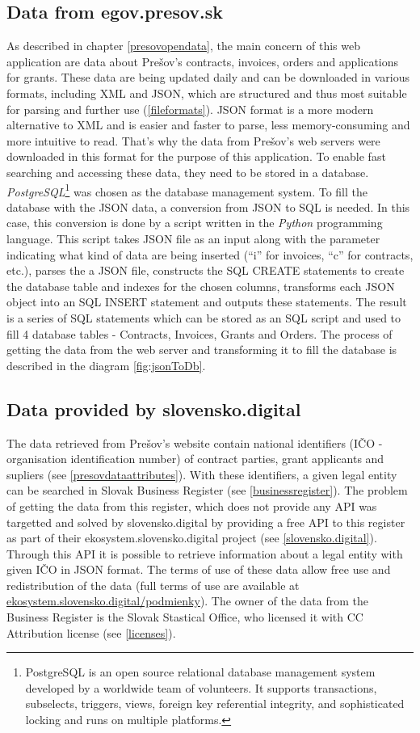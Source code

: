 \documentclass[thesis=B,english]{sprlajur-slovakopendata}[2018/05/12]
\begin{document}
\subsection{Data from egov.presov.sk}
As described in chapter \ref{presovopendata}, the main concern of this web application are data about Prešov's contracts, invoices, orders and applications for grants. These data are being updated daily and can be downloaded in various formats, including XML and JSON, which are structured and thus most suitable for parsing and further use (\ref{fileformats}). JSON format is a more modern alternative to XML and is easier and faster to parse, less memory-consuming and more intuitive to read. That's why the data from Prešov's web servers were downloaded in this format for the purpose of this application. To enable fast searching and accessing these data, they need to be stored in a database. \textit{PostgreSQL}\footnote{PostgreSQL is an open source relational database management system developed by a worldwide team of volunteers. It supports transactions, subselects, triggers, views, foreign key referential integrity, and sophisticated locking and runs on multiple platforms.} was chosen as the database management system. To fill the database with the JSON data, a conversion from JSON to SQL is needed. In this case, this conversion is done by a script written in the \textit{Python} programming language. This script takes JSON file as an input along with the parameter indicating what kind of data are being inserted (``i'' for invoices, ``c'' for contracts, etc.), parses the a JSON file, constructs the SQL CREATE statements to create the database table and indexes for the chosen columns, transforms each JSON object into an SQL INSERT statement and outputs these statements. The result is a series of SQL statements which can be stored as an SQL script and used to fill 4 database tables - Contracts, Invoices, Grants and Orders. The process of getting the data from the web server and transforming it to fill the database is described in the diagram \ref{fig:jsonToDb}.

\subsection{Data provided by slovensko.digital}
\label{data-slovensko-digital}
The data retrieved from Prešov's website contain national identifiers (IČO - organisation identification number) of contract parties, grant applicants and supliers (see \ref{presovdataattributes}). With these identifiers, a given legal entity can be searched in Slovak Business Register (see \ref{businessregister}). The problem of getting the data from this register, which does not provide any API was targetted and solved by slovensko.digital by providing a free API to this register as part of their ekosystem.slovensko.digital project (see \ref{slovensko.digital}). Through this API it is possible to retrieve information about a legal entity with given IČO in JSON format. The terms of use of these data allow free use and redistribution of the data (full terms of use are available at \url{ekosystem.slovensko.digital/podmienky}). The owner of the data from the Business Register is the Slovak Stastical Office, who licensed it with CC Attribution license (see \ref{licenses}).
	
\end{document}
